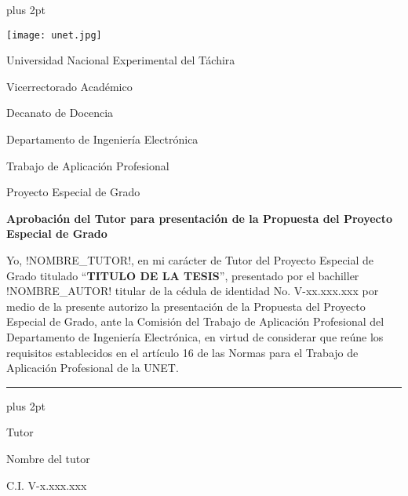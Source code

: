 % 

\begin{titlepage}
\parskip=7.25pt plus 2pt
\setcounter{page}{4}
\begin{center}
	\begin{spacing}{1}
	\texttt{[image: unet.jpg]}
	
	Universidad Nacional Experimental del Táchira 
	
	Vicerrectorado Académico
	
	Decanato de Docencia
	
	Departamento de Ingeniería Electrónica
	
	Trabajo de Aplicación Profesional
	
	Proyecto Especial de Grado
	\end{spacing}
\end{center}

\vspace{0.5cm}

\begin{center}
		
		\textbf{Aprobación del Tutor para presentación de la Propuesta del Proyecto Especial de Grado}
		
\end{center}

\vspace{0.5cm}

\begin{spacing}{1.5}
	Yo, !NOMBRE\_TUTOR!, en mi carácter de Tutor del Proyecto Especial de Grado titulado \enquote{\textbf{TITULO DE LA TESIS}}, presentado por el bachiller !NOMBRE\_AUTOR! titular de la cédula de identidad No. \mbox{V-xx.xxx.xxx} por medio de la presente autorizo la presentación de la Propuesta del Proyecto Especial de Grado, ante la Comisión del Trabajo de Aplicación Profesional del Departamento de Ingeniería Electrónica, en virtud de considerar que reúne los requisitos establecidos en el artículo 16 de las Normas para el Trabajo de Aplicación Profesional de la UNET.
\end{spacing}

\vfill

\begin{center}
	
	\rule{6cm}{1pt}
	
	\vspace{0.2cm}
	
	\parskip=0pt plus 2pt
    
    \begin{spacing}{1}
        Tutor
    
        Nombre del tutor
    
        C.I. V-x.xxx.xxx
    \end{spacing}
\end{center}

\vspace{0.5cm}

\end{titlepage}
